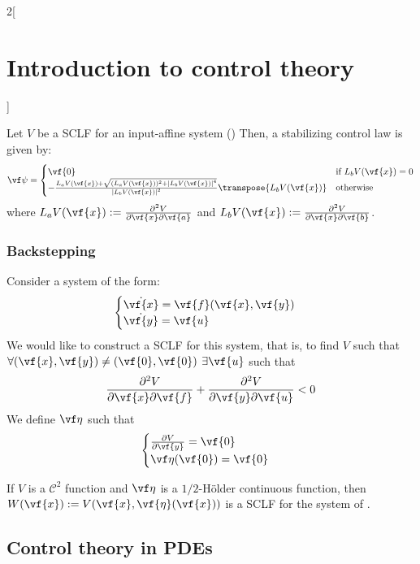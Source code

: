 \documentclass[../../../main_math.tex]{subfiles}
\begin{document}
\begin{multicols}{2}[\section{Introduction to control theory}]
\begin{theorem}
  \end{theorem}
  \begin{theorem}
    Let $V$ be a SCLF for an input-affine system () Then, a stabilizing control law is given by:
    $$
      \vf\psi=\begin{cases}
        \vf{0}                                                                                                          & \text{if } L_bV(\vf{x})=0 \\
        -\frac{L_aV(\vf{x})+\sqrt{(L_aV(\vf{x}))^2+\abs{L_bV(\vf{x})}^4}}{\abs{L_bV(\vf{x})}^2}\transpose{L_bV(\vf{x})} & \text{otherwise}
      \end{cases}
    $$
    where $L_aV(\vf{x}):=\pdv{V}{\vf{x}}\vf{a}(\vf{x})$ and $L_bV(\vf{x}):=\pdv{V}{\vf{x}}\vf{b}(\vf{x})$.
  \end{theorem}
  \subsubsection{Backstepping}
  Consider a system of the form:
  \begin{equation}\label{ICT:backstepping}
    \begin{cases}
      \dot{\vf{x}} = \vf{f}(\vf{x}, \vf{y}) \\
      \dot{\vf{y}} = \vf{u}
    \end{cases}
  \end{equation}
  We would like to construct a SCLF for this system, that is, to find $V$ such that $\forall (\vf{x}, \vf{y})\ne (\vf{0}, \vf{0})$ $\exists \vf{u}$ such that $$
    \pdv{V}{\vf{x}}\vf{f}(\vf{x}, \vf{y}) + \pdv{V}{\vf{y}}\vf{u}<0
  $$
  We define $\vf\eta$ such that
  $$
    \begin{cases}
      \pdv{V}{\vf{y}}(\vf{x}, \vf{\eta}(x)) = \vf{0} \\
      \vf\eta(\vf{0}) = \vf{0}
    \end{cases}
  $$
  \begin{lemma}
    If $V$ is a $\mathcal{C}^2$ function and $\vf\eta$ is a $1/2$-Hölder continuous function, then $W(\vf{x}):=V(\vf{x}, \vf{\eta}(\vf{x}))$ is a SCLF for the system of .
  \end{lemma}
  \subsection{Control theory in PDEs}
\end{multicols}
\end{document}
